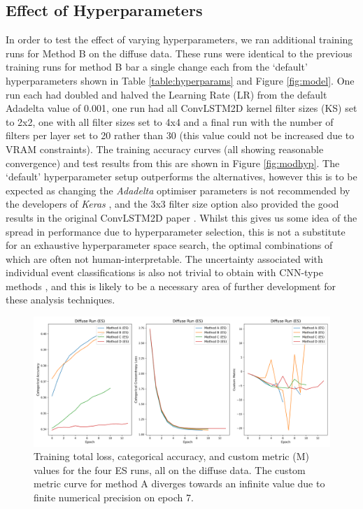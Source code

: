 \subsection{Effect of Hyperparameters}
In order to test the effect of varying hyperparameters, we ran additional training runs for Method B on the diffuse data. These runs were identical to the previous training runs for method B bar a single change each from the `default' hyperparameters shown in Table \ref{table:hyperparams} and Figure \ref{fig:model}. One run each had doubled and halved the Learning Rate (LR) from the default Adadelta value of 0.001, one run had all ConvLSTM2D kernel filter sizes (KS) set to 2x2, one with all filter sizes set to 4x4 and a final run with the number of filters per layer set to 20 rather than 30 (this value could not be increased due to VRAM constraints). The training accuracy curves (all showing reasonable convergence) and test results from this are shown in Figure \ref{fig:modhyp}. The `default' hyperparameter setup outperforms the alternatives, however this is to be expected as changing the \textit{Adadelta} optimiser parameters is not recommended by the developers of \textit{Keras} \cite{Keras}, and the 3x3 filter size option also provided the good results in the original ConvLSTM2D paper \cite{shi}. Whilst this gives us some idea of the spread in performance due to hyperparameter selection, this is not a substitute for an exhaustive hyperparameter space search, the optimal combinations of which are often not human-interpretable. The uncertainty associated with individual event classifications is also not trivial to obtain with CNN-type methods \cite{mike}\cite{gal2015}, and this is likely to be a necessary area of further development for these analysis techniques.

 \begin{figure}[t]
  \centering
  \includegraphics[width=\textwidth]{figures/trainlogES.png}
  \caption{Training total loss, categorical accuracy, and custom metric (M) values for the four ES runs, all on the diffuse data. The custom metric curve for method A diverges towards an infinite value due to finite numerical precision on epoch 7.
  }
  \label{fig:trainlogES}
\end{figure}

